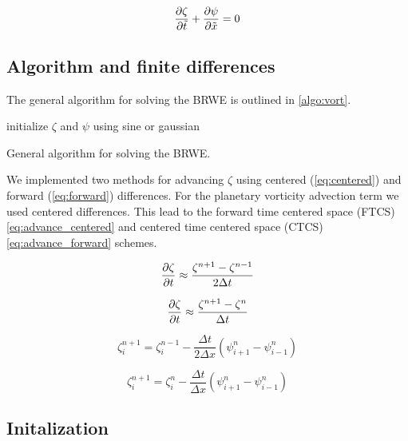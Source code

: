 \begin{equation}\label{eq:scaled_BRWE}
  \pdv{\zeta}{\tilde{t}} + \pdv{\psi}{\tilde{x}} = 0
\end{equation}


\subsection{Algorithm and finite differences}

The general algorithm for solving the BRWE is outlined in
\cref{algo:vort}.

\begin{algorithm}[H]
  \SetAlgoLined
  initialize $\zeta$ and $\psi$ using sine or gaussian\\
  \caption{General algorithm for solving the BRWE.}
  \label{algo:vort}
\end{algorithm}

We implemented two methods for advancing $\zeta$ using centered
(\cref{eq:centered}) and forward (\cref{eq:forward}) differences. For the
planetary vorticity advection term we used centered differences. This lead to
the forward time centered space (FTCS) \cref{eq:advance_centered} and centered
time centered space (CTCS) \cref{eq:advance_forward} schemes.


\begin{equation} \label{eq:centered}
  \pdv{\zeta}{t} \approx \frac{\zeta_{}^{n+1} - \zeta_{}^{n-1}}{2 \Delta t}
\end{equation}

\begin{equation} \label{eq:forward}
  \pdv{\zeta}{t} \approx \frac{\zeta_{}^{n+1} - \zeta_{}^{n}}{\Delta t}
\end{equation}


\begin{equation} \label{eq:advance_centered}
  \zeta_{i}^{n+1} = \zeta_{i}^{n-1} - \frac{\Delta t}{2 \Delta x}
    (\psi_{i+1}^{n} - \psi_{i-1}^{n})
\end{equation}


\begin{equation}   \label{eq:advance_forward}
  \zeta_{i}^{n+1} = \zeta_{i}^{n} - \frac{\Delta t}{\Delta x} (\psi_{i+1}^{n} - \psi_{i-1}^{n})
\end{equation}


\subsection{Initalization}

